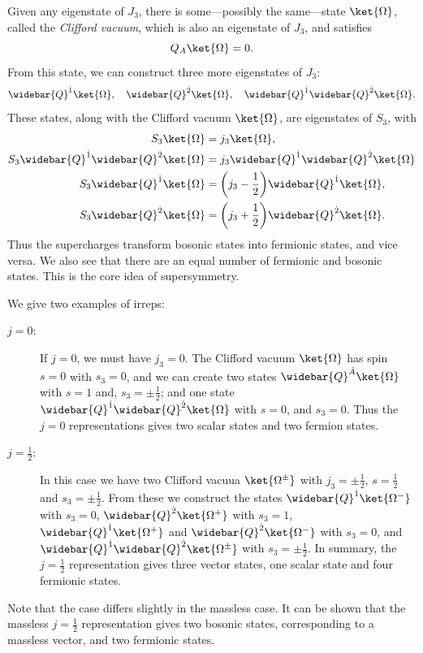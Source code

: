 Given any eigenstate of $J_3$, there is some---possibly the same---state $\ket{\Omega}$, called the \emph{Clifford vacuum}, which is also an eigenstate of $J_3$, and satisfies
\begin{equation}
    Q_A \ket{\Omega} = 0.
\end{equation}
From this state, we can construct three more eigenstates of $J_3$:
\begin{equation}
    \widebar{Q}^{\dot{1}} \ket{\Omega},
    \quad
    \widebar{Q}^{\dot{2}} \ket{\Omega},
    \quad
    \widebar{Q}^{\dot{1}} \widebar{Q}^{\dot{2}} \ket{\Omega}.
\end{equation}
These states, along with the Clifford vacuum $\ket{\Omega}$, are eigenstates of $S_3$, with
\begin{subequations}
\label{eq:clifford_vacuum_super_states}
\begin{align}
    S_3 \ket{\Omega} &= j_3 \ket{\Omega},
    \\
    S_3 \widebar{Q}^{\dot{1}} \widebar{Q}^{\dot{2}} \ket{\Omega} &= j_3 \widebar{Q}^{\dot{1}} \widebar{Q}^{\dot{2}} \ket{\Omega}
    \\
    S_3 \widebar{Q}^{\dot{1}} \ket{\Omega} &= \biggl(j_3 - \frac{1}{2}\biggr) \widebar{Q}^{\dot{1}} \ket{\Omega},
    \\
    S_3 \widebar{Q}^{\dot{2}} \ket{\Omega} &= \biggl(j_3 + \frac{1}{2}\biggr) \widebar{Q}^{\dot{2}} \ket{\Omega}.
\end{align}
\end{subequations}
Thus the supercharges transform bosonic states into fermionic states, and vice versa.
We also see that there are an equal number of fermionic and bosonic states. This is the core idea of supersymmetry.

We give two examples of \glspl{irrep}:
\begin{description}
    \item[$j=0$:] If $j=0$, we must have $j_3=0$. The Clifford vacuum $\ket{\Omega}$ has spin $s=0$ with $s_3=0$, and we can create two states $\widebar{Q}^{\dot{A}}\ket{\Omega}$ with $s=1$ and, $s_3=\pm\frac{1}{2}$; and one state $\widebar{Q}^{\dot1}\widebar{Q}^{\dot2}\ket{\Omega}$ with $s=0$, and $s_3=0$.
    Thus the $j=0$ representations gives two scalar states and two fermion states.
    \item[$j=\frac{1}{2}$:] In this case we have two Clifford vacuua $\ket{\Omega^\pm}$ with $j_3=\pm\frac{1}{2}$, $s=\frac{1}{2}$ and $s_3=\pm\frac{1}{2}$. From these we construct the states $\widebar{Q}^{\dot1}\ket{\Omega^-}$ with $s_3=0$, $\widebar{Q}^{\dot2}\ket{\Omega^+}$ with $s_3=1$, $\widebar{Q}^{\dot1}\ket{\Omega^+}$ and $\widebar{Q}^{\dot2}\ket{\Omega^-}$ with $s_3=0$, and $\widebar{Q}^{\dot1}\widebar{Q}^{\dot2}\ket{\Omega^\pm}$ with $s_3=\pm\frac{1}{2}$.
    In summary, the $j=\frac{1}{2}$ representation gives three vector states, one scalar state and four fermionic states.
\end{description}
Note that the case differs slightly in the massless case. It can be shown that the massless $j=\frac{1}{2}$ representation gives two bosonic states, corresponding to a massless vector, and two fermionic states.


